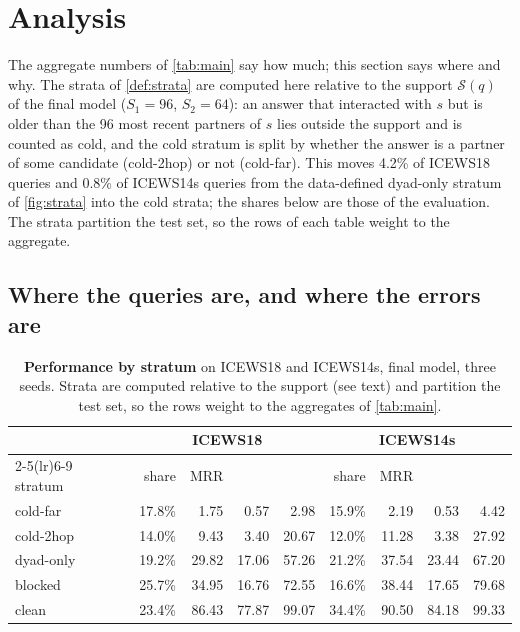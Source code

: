 \section{Analysis}
\label{sec:analysis}

The aggregate numbers of \cref{tab:main} say how much; this section says where and why. The strata of \cref{def:strata} are computed here relative to the support $\mathcal{S}(q)$ of the final model ($S_1 = 96$, $S_2 = 64$): an answer that interacted with $s$ but is older than the 96 most recent partners of $s$ lies outside the support and is counted as cold, and the cold stratum is split by whether the answer is a partner of some candidate (cold-2hop) or not (cold-far). This moves 4.2\% of ICEWS18 queries and 0.8\% of ICEWS14s queries from the data-defined dyad-only stratum of \cref{fig:strata} into the cold strata; the shares below are those of the evaluation. The strata partition the test set, so the rows of each table weight to the aggregate.

\subsection{Where the queries are, and where the errors are}

\begin{table}[t]
  \centering\small
  \caption{\textbf{Performance by stratum} on ICEWS18 and ICEWS14s, final model, three seeds. Strata are computed relative to the support (see text) and partition the test set, so the rows weight to the aggregates of \cref{tab:main}.}
  \label{tab:strata}
  \setlength{\tabcolsep}{2.8pt}\footnotesize
  \begin{tabular}{l rrrr rrrr}
    \toprule
    & \multicolumn{4}{c}{ICEWS18} & \multicolumn{4}{c}{ICEWS14s} \\
    \cmidrule(lr){2-5}\cmidrule(lr){6-9}
    stratum & share & MRR & \hone{} & \hten{} & share & MRR & \hone{} & \hten{} \\
    \midrule
    cold-far   & 17.8\% &  1.75 &  0.57 &  2.98 & 15.9\% &  2.19 &  0.53 &  4.42 \\
    cold-2hop  & 14.0\% &  9.43 &  3.40 & 20.67 & 12.0\% & 11.28 &  3.38 & 27.92 \\
    dyad-only  & 19.2\% & 29.82 & 17.06 & 57.26 & 21.2\% & 37.54 & 23.44 & 67.20 \\
    blocked    & 25.7\% & 34.95 & 16.76 & 72.55 & 16.6\% & 38.44 & 17.65 & 79.68 \\
    clean      & 23.4\% & 86.43 & 77.87 & 99.07 & 34.4\% & 90.50 & 84.18 & 99.33 \\
    \bottomrule
  \end{tabular}
\end{table}

